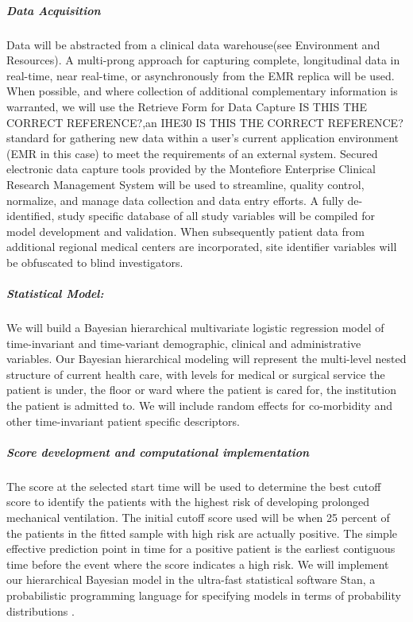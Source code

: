 \documentclass[11pt,notitlepage]{article}
\begin{document}
\subparagraph*{Data Acquisition}
Data will be abstracted from a clinical data warehouse(see Environment and Resources). A multi-prong approach for capturing complete, longitudinal data in real-time, near real-time, or asynchronously from the EMR replica will be used. When possible, and where collection of additional complementary information is warranted, we will use the Retrieve Form for Data Capture IS THIS THE CORRECT REFERENCE?\cite{Rothenhaeusler_2005},an IHE30 IS THIS THE CORRECT REFERENCE? \cite{Rotte_15809512} standard for gathering new data within a user's current application environment (EMR in this case) to meet the requirements of an external system. Secured electronic data capture tools provided by the Montefiore Enterprise Clinical Research Management System will be used to streamline, quality control, normalize, and manage data collection and data entry efforts. A fully de-identified, study specific database of all study variables will be compiled for model development and validation. When subsequently patient data from additional regional medical centers are incorporated, site identifier variables will be obfuscated to blind investigators.

\subparagraph*{Statistical Model:}
We will build a Bayesian hierarchical multivariate logistic regression model of time-invariant and time-variant demographic, clinical  and administrative variables. Our Bayesian hierarchical modeling will represent the multi-level nested structure of current health care, with levels for medical or surgical service the patient is under, the floor or ward where the patient is cared for, the institution the patient is admitted to. We will include random effects for co-morbidity and other time-invariant patient specific descriptors. 

\subparagraph*{Score development and computational implementation}
The score at the selected start time will be used to determine the best cutoff score to identify the patients with the highest risk of developing prolonged mechanical ventilation. The initial cutoff score used will be when 25 percent of the patients in the fitted sample with high risk are actually positive. The simple effective prediction point in time for a positive patient is the earliest contiguous time before the event where the score indicates a high risk. We will implement our hierarchical Bayesian model in the ultra-fast statistical software Stan, a probabilistic programming language for specifying models in terms of probability distributions \cite{Stan_Software_2014}. 
\end{document}
